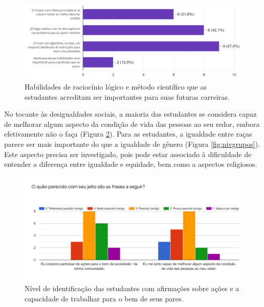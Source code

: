 \documentclass[
]{book}
\begin{document}
\begin{figure}

{\centering \includegraphics[width=1\linewidth,height=0.8\textheight]{images/image43} 

}

\caption{Habilidades de raciocínio lógico e método científico que as estudantes acreditam ser importantes para suas futuras carreiras.}\label{fig:habilidades}
\end{figure}

No tocante às desigualdades sociais, a maioria das estudantes se considera capaz de melhorar algum aspecto da condição de vida das pessoas ao seu redor, embora efetivamente não o faça (Figura \ref{fig:nivpares}). Para as estudantes, a igualdade entre raças parece ser mais importante do que a igualdade de gênero (Figura \ref{fig:nivgrupos}). Este aspecto precisa ser investigado, pois pode estar associado à dificuldade de entender a diferença entre igualdade e equidade, bem como a aspectos religiosos.

\begin{figure}

{\centering \includegraphics[width=1\linewidth,height=0.8\textheight]{images/image44} 

}

\caption{Nível de identificação das estudantes com afirmações sobre ações e a capacidade de trabalhar para o bem de seus pares.}\label{fig:nivpares}
\end{figure}
\end{document}
